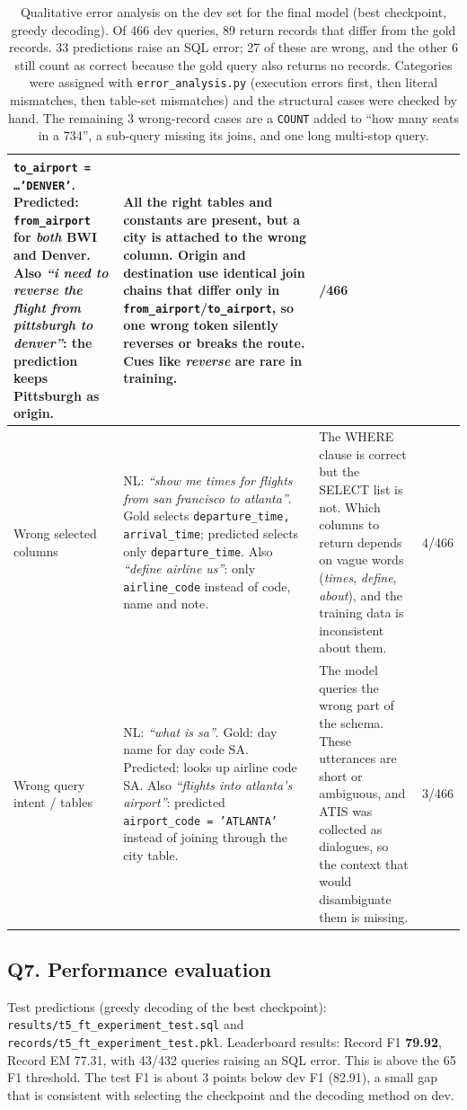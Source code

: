 \documentclass[11pt]{article}
\begin{document}
\begin{table}[H]
\begin{tabularx}{\textwidth}{>{\raggedright\arraybackslash}p{1.9cm}>{\raggedright\arraybackslash}X>{\raggedright\arraybackslash}Xr}
\texttt{to\_airport = \ldots 'DENVER'}. Predicted: \texttt{from\_airport} for \emph{both} BWI and Denver.
Also \emph{``i need to reverse the flight from pittsburgh to denver''}: the prediction keeps Pittsburgh as origin. &
All the right tables and constants are present, but a city is attached to the wrong column. Origin and destination
use identical join chains that differ only in \texttt{from\_airport}/\texttt{to\_airport}, so one wrong token
silently reverses or breaks the route. Cues like \emph{reverse} are rare in training. &
4/466 \\
\midrule
Wrong selected columns &
NL: \emph{``show me times for flights from san francisco to atlanta''}. Gold selects
\texttt{departure\_time, arrival\_time}; predicted selects only \texttt{departure\_time}. Also \emph{``define
airline us''}: only \texttt{airline\_code} instead of code, name and note. &
The WHERE clause is correct but the SELECT list is not. Which columns to return depends on vague words
(\emph{times}, \emph{define}, \emph{about}), and the training data is inconsistent about them. &
4/466 \\
\midrule
Wrong query intent / tables &
NL: \emph{``what is sa''}. Gold: day name for day code SA. Predicted: looks up airline code SA. Also
\emph{``flights into atlanta's airport''}: predicted \texttt{airport\_code = 'ATLANTA'} instead of joining through
the city table. &
The model queries the wrong part of the schema. These utterances are short or ambiguous, and ATIS was collected
as dialogues, so the context that would disambiguate them is missing. &
3/466 \\
\bottomrule
\end{tabularx}
\caption{Qualitative error analysis on the dev set for the final model (best checkpoint, greedy decoding).
Of 466 dev queries, 89 return records that differ from the gold records. 33 predictions raise an SQL error; 27 of
these are wrong, and the other 6 still count as correct because the gold query also returns no records.
Categories were assigned with \texttt{error\_analysis.py} (execution errors first, then literal mismatches, then
table-set mismatches) and the structural cases were checked by hand. The remaining 3 wrong-record cases are a
\texttt{COUNT} added to ``how many seats in a 734'', a sub-query missing its joins, and one long multi-stop query.}
\end{table}

\subsection*{Q7. Performance evaluation}
Test predictions (greedy decoding of the best checkpoint): \texttt{results/t5\_ft\_experiment\_test.sql} and \texttt{records/t5\_ft\_experiment\_test.pkl}.
Leaderboard results: Record F1 \textbf{79.92}, Record EM 77.31, with 43/432 queries raising an SQL error. This is above
the 65 F1 threshold. The test F1 is about 3 points below dev F1 (82.91), a small gap that is consistent with selecting the
checkpoint and the decoding method on dev.
\end{document}
